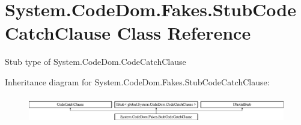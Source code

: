 \hypertarget{class_system_1_1_code_dom_1_1_fakes_1_1_stub_code_catch_clause}{\section{System.\-Code\-Dom.\-Fakes.\-Stub\-Code\-Catch\-Clause Class Reference}
\label{class_system_1_1_code_dom_1_1_fakes_1_1_stub_code_catch_clause}
}


Stub type of System.\-Code\-Dom.\-Code\-Catch\-Clause 


Inheritance diagram for System.\-Code\-Dom.\-Fakes.\-Stub\-Code\-Catch\-Clause\-:\begin{figure}[H]
\begin{center}
\leavevmode
\includegraphics[height=1.185185cm]{class_system_1_1_code_dom_1_1_fakes_1_1_stub_code_catch_clause}
\end{center}
\end{figure}
